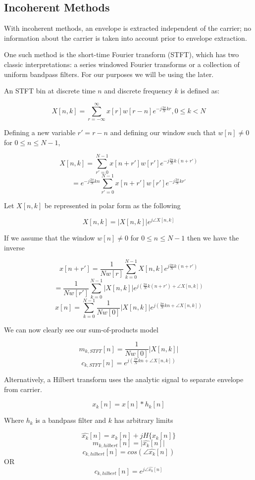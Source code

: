 \documentclass [11pt, proquest] {uwthesis}[2015/03/03]
\begin{document}
\subsection{Incoherent Methods}

With incoherent methods, an envelope is extracted independent of the carrier; no information about the carrier is taken into account prior to envelope extraction.

One such method is the short-time Fourier transform (STFT), which has two classic interpretations: a series windowed Fourier transforms or a collection of uniform bandpass filters.  For our purposes we will be using the later.

An STFT bin at discrete time $n$ and discrete frequency $k$ is defined as:

$$X[n,k] = \sum\limits_{r=-\infty}^{\infty} x[r] w[r - n] e^{-j\frac{2\pi}{N}kr}, 0 \leq k < N$$

Defining a new variable $r' = r - n$ and defining our window such that  $w[n] \neq 0$ for $0 \leq n \leq N-1$,

$$X[n,k] = \sum\limits_{r'=0}^{N-1} x[n + r'] w[r'] e^{-j\frac{2\pi}{N}k(n + r')}$$
$$= e^{-j\frac{2\pi}{N}kn} \sum\limits_{r'=0}^{N-1} x[n + r'] w[r'] e^{-j\frac{2\pi}{N}kr'}$$

Let $X[n,k]$ be represented in polar form as the following

$$X[n,k] = \vert X[n,k]\vert e^{j\angle X[n,k]}$$

If we assume that the window $w[n] \neq 0$ for $0 \leq n \leq N-1$ then we have the inverse

$$x[n + r'] = \frac{1}{Nw[r]}  \sum\limits_{k=0}^{N-1} X[n,k] e^{j\frac{2\pi}{N}k(n+r')}$$
$$= \frac{1}{Nw[r']}  \sum\limits_{k=0}^{N-1} \vert X[n,k]\vert e^{j(\frac{2\pi}{N}k(n+r') + \angle X[n,k])}$$
$$x[n] =\sum\limits_{k=0}^{N-1}  \frac{1}{Nw[0]}  \vert X[n,k]\vert e^{j(\frac{2\pi}{N}kn + \angle X[n,k])}$$

We can now clearly see our sum-of-products model

$$m_{k,STFT}[n] =  \frac{1}{Nw[0]}  \vert X[n,k]\vert$$
$$c_{k,STFT}[n] = e^{j(\frac{2\pi}{N}kn + \angle X[n,k])}$$

Alternatively, a Hilbert transform uses the analytic signal to separate envelope from carrier.

$$x_k[n] = x[n] * h_k[n]$$

Where $h_k$ is a bandpass filter and $k$ has arbitrary limits

$$\widehat{x_k}[n] = x_k[n] + jH\{x_k[n]\}$$
$$m_{k,hilbert}[n] = \vert\widehat{x_k}[n]\vert$$
$$c_{k,hilbert}[n] = cos(\angle\widehat{x_k}[n])$$
OR
$$c_{k,hilbert}[n] = e^{j\angle\widehat{x_k}[n]}$$
\end{document}
